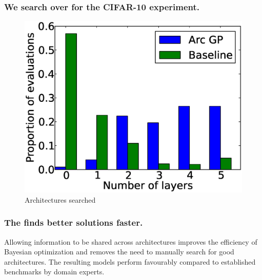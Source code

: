 \documentclass[12pt,onlymath]{beamer}
\begin{document}
\begin{frame}\frametitle{We search over  for the CIFAR-10 experiment.}


\begin{figure}[t!]
	\centering
		\includegraphics[width=0.8\columnwidth]{figures/fevals_per_layer}
		\caption{Architectures searched}
		\label{fig:proparchs}
\end{figure}

\end{frame}

\begin{frame}\frametitle{The  finds better solutions faster.}
Allowing information to be shared across architectures improves the efficiency of Bayesian optimization and removes the need to manually search for good architectures.
\vfill
The resulting models perform favourably compared to established benchmarks by domain experts.
\end{frame}


\end{document}
